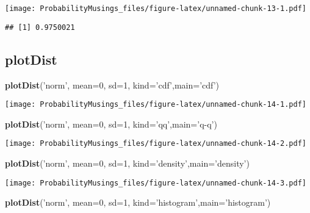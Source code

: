 \documentclass[]{article}
\newenvironment{Shaded}{\begin{snugshade}}{\end{snugshade}}
\newcommand{\KeywordTok}[1]{\textcolor[rgb]{0.13,0.29,0.53}{\textbf{#1}}}
\newcommand{\DataTypeTok}[1]{\textcolor[rgb]{0.13,0.29,0.53}{#1}}
\newcommand{\DecValTok}[1]{\textcolor[rgb]{0.00,0.00,0.81}{#1}}
\newcommand{\StringTok}[1]{\textcolor[rgb]{0.31,0.60,0.02}{#1}}
\newcommand{\NormalTok}[1]{#1}
\begin{document}
\texttt{[image: ProbabilityMusings\_files/figure-latex/unnamed-chunk-13-1.pdf]}

\begin{verbatim}
## [1] 0.9750021
\end{verbatim}

\subsection{plotDist}\label{plotdist}

\begin{Shaded}
\begin{Highlighting}[]
\KeywordTok{plotDist}\NormalTok{(}\StringTok{'norm'}\NormalTok{, }\DataTypeTok{mean=}\DecValTok{0}\NormalTok{, }\DataTypeTok{sd=}\DecValTok{1}\NormalTok{, }\DataTypeTok{kind=}\StringTok{'cdf'}\NormalTok{,}\DataTypeTok{main=}\StringTok{'cdf'}\NormalTok{)}
\end{Highlighting}
\end{Shaded}

\texttt{[image: ProbabilityMusings\_files/figure-latex/unnamed-chunk-14-1.pdf]}

\begin{Shaded}
\begin{Highlighting}[]
\KeywordTok{plotDist}\NormalTok{(}\StringTok{'norm'}\NormalTok{, }\DataTypeTok{mean=}\DecValTok{0}\NormalTok{, }\DataTypeTok{sd=}\DecValTok{1}\NormalTok{, }\DataTypeTok{kind=}\StringTok{'qq'}\NormalTok{,}\DataTypeTok{main=}\StringTok{'q-q'}\NormalTok{)}
\end{Highlighting}
\end{Shaded}

\texttt{[image: ProbabilityMusings\_files/figure-latex/unnamed-chunk-14-2.pdf]}

\begin{Shaded}
\begin{Highlighting}[]
\KeywordTok{plotDist}\NormalTok{(}\StringTok{'norm'}\NormalTok{, }\DataTypeTok{mean=}\DecValTok{0}\NormalTok{, }\DataTypeTok{sd=}\DecValTok{1}\NormalTok{, }\DataTypeTok{kind=}\StringTok{'density'}\NormalTok{,}\DataTypeTok{main=}\StringTok{'density'}\NormalTok{)}
\end{Highlighting}
\end{Shaded}

\texttt{[image: ProbabilityMusings\_files/figure-latex/unnamed-chunk-14-3.pdf]}

\begin{Shaded}
\begin{Highlighting}[]
\KeywordTok{plotDist}\NormalTok{(}\StringTok{'norm'}\NormalTok{, }\DataTypeTok{mean=}\DecValTok{0}\NormalTok{, }\DataTypeTok{sd=}\DecValTok{1}\NormalTok{, }\DataTypeTok{kind=}\StringTok{'histogram'}\NormalTok{,}\DataTypeTok{main=}\StringTok{'histogram'}\NormalTok{)}
\end{Highlighting}
\end{Shaded}
\end{document}
